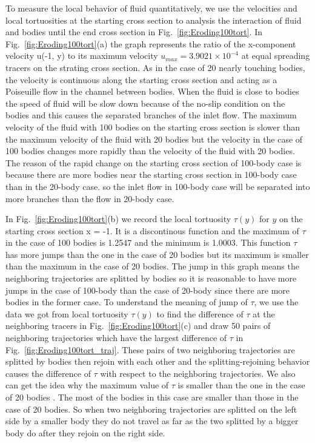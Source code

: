 \documentclass[preprint, 10pt]{elsarticle}
\begin{document}
{To measure the local behavior of fluid quantitatively, 
we use the velocities and local tortuosities at the starting cross section 
to analysis the interaction of fluid and bodies until the end cross section 
in Fig.~\ref{fig:Eroding100tort}.
In Fig.~\ref{fig:Eroding100tort}(a) the graph represents the ratio of the
x-component velocity u(-1, y) to its maximum velocity $u_{max}=3.9021
\times 10^{-4}$ at equal spreading tracers on the strating cross section.
As in the case of 20 nearly touching bodies, the velocity is continuous along
the starting cross section and acting as a Poiseuille flow in the channel between
bodies. When the fluid is close to bodies
the speed of fluid will be slow down because of the no-slip condition on the bodies
and this causes the separated branches of the inlet flow.
The maximum velocity of the fluid with 100 bodies on the starting cross 
section is slower than the maximum velocity of the fluid with 20 bodies
but the velocity in the case of 100 bodies 
changes more rapidly than the velocity of the fluid with 20 bodies.
The reason of the rapid change on the starting cross section of 
100-body case is because there are 
more bodies near the starting cross section in
100-body case than in the 20-body case. 
so the inlet flow in 100-body case
will be separated into more branches than the flow in 20-body case. 

In Fig.~\ref{fig:Eroding100tort}(b) we record the 
local tortuosity $\tau(y)$ for $y$ on the starting cross section x = -1.
It is a discontinous function and the maximum of $\tau$ in the case of 100 bodies
is 1.2547 and the minimum is 1.0003. This function $\tau$
has more jumps than the one in the case of 20 bodies but its maximum 
is smaller than the maximum in the case of 20 bodies. 
The jump in this graph means the neighboring trajectories are splitted by bodies
so it is reasonable to have more jumps in the case of 100-body than the case of 20-body
since there are more bodies in the former case. To understand the meaning of jump 
of $\tau$, we use the data we got from local tortuosity $\tau(y)$
to find the difference of $\tau$ at the neighboring tracers in Fig.~\ref{fig:Eroding100tort}(c) 
and draw 50 pairs of neighboring trajectories which have the largest difference of $\tau$
in Fig.~\ref{fig:Eroding100tort_traj}. These pairs of two neighboring trajectories are splitted by bodies
then rejoin with each other and the splitting-rejoining behavior causes the difference of $\tau$ with respect to the neighboring trajectories.   
We also can get the idea why the maximum value of $\tau$ is smaller 
than the one in the case of 20 bodies . 
The most of the bodies in this case are smaller than those in the case of 20 bodies.
So when two neighboring trajectories are splitted on the left side by a smaller body they do not
travel as far as the two splitted by a bigger body do after they rejoin on the right side. 
}
\end{document}
